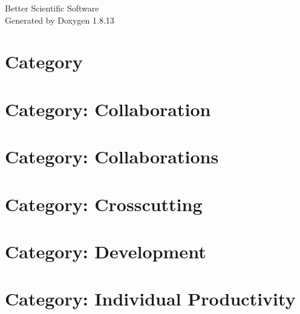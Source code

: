 \documentclass[twoside]{book}
\newcommand{\+}{\discretionary{\mbox{\scriptsize$\hookleftarrow$}}{}{}}
\newcommand{\clearemptydoublepage}{%
  \newpage{\pagestyle{empty}\cleardoublepage}%
}
\begin{document}
\hypersetup{pageanchor=false,
             bookmarksnumbered=true,
             pdfencoding=unicode
            }
\begin{titlepage}
\vspace*{7cm}
\begin{center}%
{\Large Better Scientific Software }\\
\vspace*{1cm}
{\large Generated by Doxygen 1.8.13}\\
\end{center}
\end{titlepage}
\clearemptydoublepage
{}
\tableofcontents
\clearemptydoublepage
{}
\hypersetup{pageanchor=true}

\chapter{Category}
\label{md_markdown_category}

\chapter{Category\+: Collaboration}
\label{md_markdown_category_collaboration}

\chapter{Category\+: Collaborations}
\label{md_markdown_category_collaborations}

\chapter{Category\+: Crosscutting}
\label{md_markdown_category_crosscutting}

\chapter{Category\+: Development}
\label{md_markdown_category_development}

\chapter{Category\+: Individual Productivity}
\label{md_markdown_category_individual_productivity}

\end{document}

